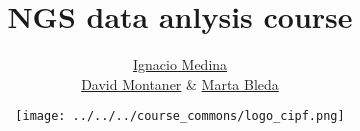 \documentclass{beamer}
\begin{document}



\title[\hspace{2em} NGS data anlysis course \hspace{8em} \insertframenumber\ / \inserttotalframenumber]{NGS data anlysis course}

\subtitle{{\color{gray}\titulolargo}} %

\author[\titulocorto \hspace{2em}]{
\href{http://www.dmontaner.com}{Ignacio Medina} \\
\href{http://www.dmontaner.com}{David Montaner}  
 \& \href{http://www.dmontaner.com}{Marta Bleda}}


\date{\texttt{[image: ../../../course\_commons/logo\_cipf.png]}}


\begin{frame}
  \maketitle
\end{frame}



\end{document}
